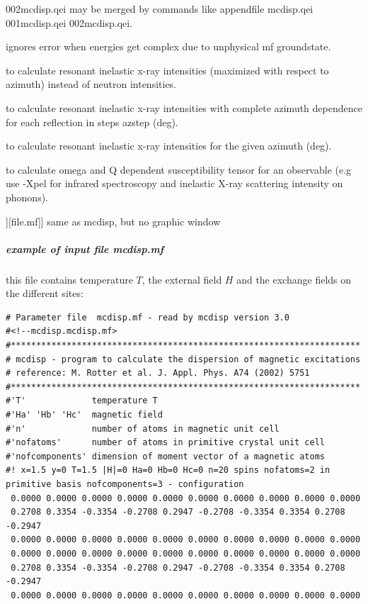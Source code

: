 \begin{description}
\begin{description}
                  {\prg 002mcdisp.qei} may be merged by commands like {\prg appendfile mcdisp.qei 001mcdisp.qei 002mcdisp.qei}.
    \item [{\prg -ignore\_not\_posdef\_matrix\_error}] ignores error when energies get complex due to unphysical mf groundstate.
    \item [{\prg -x}] to calculate resonant inelastic x-ray intensities (maximized with respect to azimuth) instead of neutron intensities.
    \item [ {\prg -xa  azstp}] to calculate resonant inelastic x-ray intensities with complete azimuth dependence for each reflection in steps azstep (deg).
    \item [ {\prg -xaf  azimuth}] to calculate resonant inelastic x-ray intensities for the given azimuth (deg).				
    \item [ {\prg -X[observable]}] to calculate omega and Q dependent susceptibility tensor for an
 observable (e.g use -Xpel for infrared spectroscopy and inelastic X-ray scattering intensity on phonons). 
      \end{description}
\item [\prg mcdispit [options]][file.mf]]  same as {\prg mcdisp}, but no graphic window
\end{description} 

\subparagraph{example of input file {\prg  mcdisp.mf}}
this file contains temperature $T$, the external field $H$ and
the exchange fields on the different sites:

\begin{verbatim}
# Parameter file  mcdisp.mf - read by mcdisp version 3.0
#<!--mcdisp.mcdisp.mf>
#*********************************************************************
# mcdisp - program to calculate the dispersion of magnetic excitations
# reference: M. Rotter et al. J. Appl. Phys. A74 (2002) 5751
#*********************************************************************
#'T'             temperature T
#'Ha' 'Hb' 'Hc'  magnetic field
#'n'             number of atoms in magnetic unit cell
#'nofatoms'      number of atoms in primitive crystal unit cell
#'nofcomponents' dimension of moment vector of a magnetic atoms
#! x=1.5 y=0 T=1.5 |H|=0 Ha=0 Hb=0 Hc=0 n=20 spins nofatoms=2 in primitive basis nofcomponents=3 - configuration
 0.0000 0.0000 0.0000 0.0000 0.0000 0.0000 0.0000 0.0000 0.0000 0.0000
 0.2708 0.3354 -0.3354 -0.2708 0.2947 -0.2708 -0.3354 0.3354 0.2708 -0.2947
 0.0000 0.0000 0.0000 0.0000 0.0000 0.0000 0.0000 0.0000 0.0000 0.0000
 0.0000 0.0000 0.0000 0.0000 0.0000 0.0000 0.0000 0.0000 0.0000 0.0000
 0.2708 0.3354 -0.3354 -0.2708 0.2947 -0.2708 -0.3354 0.3354 0.2708 -0.2947
 0.0000 0.0000 0.0000 0.0000 0.0000 0.0000 0.0000 0.0000 0.0000 0.0000
\end{verbatim}

